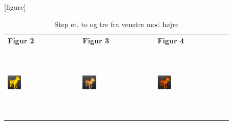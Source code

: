 \begin{table}[h!]
[figure]
\renewcommand{\therownumber}{\arabic{rownumber}} %
\setcounter{rownumber}{0} %
     \begin{flushleft}
     \begin{tabular}{ | l | l | l | }
     \hline
      \textbf{Figur 2} & \textbf{Figur 3} & \textbf{Figur 4}\\
      
{rownumber} %
    \label{row1} \includegraphics[width=0.2\textwidth,height=35mm]{Files/CelShading/silhouette4.pdf}
    
  &
{rownumber} 
    \label{row2} \includegraphics[width=0.2\textwidth, height=35mm]{Files/CelShading/silhouette5.pdf}
  
    &
{rownumber}    
     \label{row3} \includegraphics[width=0.2\textwidth, height=35mm]{Files/CelShading/silhouette6.jpg}
    
   \\ \hline
     
   \end{tabular}
   \caption{Step et, to og tre fra venstre mod højre
   \label{figtbl:modulation}}
   \end{flushleft}
   \end{table}